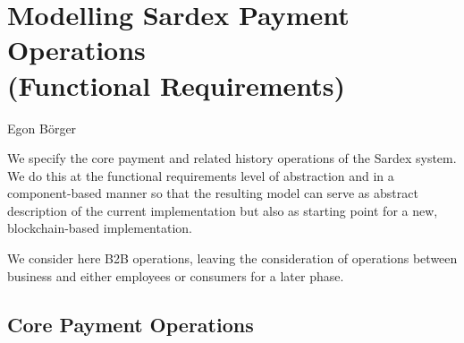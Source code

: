 \chapter{Modelling Sardex Payment Operations\\ (Functional Requirements)}
\label{ch:funreq}


\vspace{-1cm}
\begin{center}
Egon B\"orger
\end{center}




\noindent{}
\vspace{12pt}

We specify the core payment and related history operations of the Sardex system. We do this at the functional requirements  level of abstraction and in a component-based manner so that the resulting model can serve as abstract description of the current implementation but also as starting point for a new, blockchain-based implementation.

We consider here B2B operations, leaving the consideration of operations between business and either employees or consumers for a later phase.

\section{Core Payment Operations}

